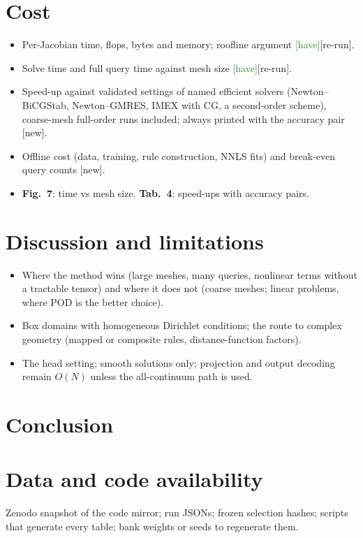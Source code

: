 \documentclass[11pt]{article}
\newcommand{\have}{\textsf{\small\textcolor{ForestGreen}{[have]}}}
\newcommand{\rerun}{\textsf{\small\textcolor{BurntOrange}{[re-run]}}}
\newcommand{\new}{\textsf{\small\textcolor{BrickRed}{[new]}}}
\newcommand{\fig}[1]{\textbf{Fig.~#1}}
\newcommand{\tab}[1]{\textbf{Tab.~#1}}
\begin{document}
\section{Cost}
\begin{itemize}
\item Per-Jacobian time, flops, bytes and memory; roofline argument \have\rerun.
\item Solve time and full query time against mesh size \have\rerun.
\item Speed-up against validated settings of named efficient solvers (Newton--BiCGStab, Newton--GMRES, IMEX with CG, a second-order scheme), coarse-mesh full-order runs included; always printed with the accuracy pair \new.
\item Offline cost (data, training, rule construction, NNLS fits) and break-even query counts \new.
\item \fig{7}: time vs mesh size. \tab{4}: speed-ups with accuracy pairs.
\end{itemize}

\section{Discussion and limitations}
\begin{itemize}
\item Where the method wins (large meshes, many queries, nonlinear terms without a tractable tensor) and where it does not (coarse meshes; linear problems, where POD is the better choice).
\item Box domains with homogeneous Dirichlet conditions; the route to complex geometry (mapped or composite rules, distance-function factors).
\item The head setting; smooth solutions only; projection and output decoding remain $O(N)$ unless the all-continuum path is used.
\end{itemize}

\section{Conclusion}

\section*{Data and code availability}
Zenodo snapshot of the code mirror; run JSONs; frozen selection hashes; scripts that generate every table; bank weights or seeds to regenerate them.
\end{document}
